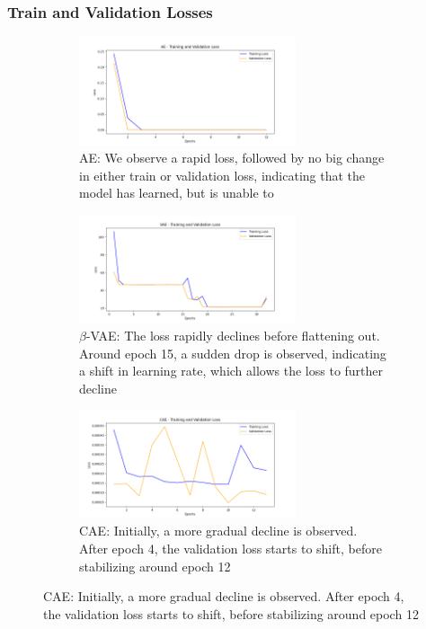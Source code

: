 \subsubsection{Train and Validation Losses}
\begin{figure}[!htbp]
  \centering
  \begin{subfigure}{\textwidth}
    \centering
    \includegraphics[width=0.7\textwidth]{figures/losses/ae.png}
    \caption{AE: We observe a rapid loss, followed by no big change in either train or validation loss, indicating that the model has learned, but is unable to }
  \end{subfigure}
  
  \vspace{0.5cm}
  
  \begin{subfigure}{\textwidth}
    \centering
    \includegraphics[width=0.7\textwidth]{figures/losses/vae.png}
    \caption{$\beta$-VAE: The loss rapidly declines before flattening out. Around epoch 15, a sudden drop is observed, indicating a shift in learning rate, which allows the loss to further decline}
  \end{subfigure}
  
  \vspace{0.5cm}
  
  \begin{subfigure}{\textwidth}
    \centering
    \includegraphics[width=0.7\textwidth]{figures/losses/cae.png}
    \caption{CAE: Initially, a more gradual decline is observed. After epoch 4, the validation loss starts to shift, before stabilizing around epoch 12}
  \end{subfigure}
  

\end{figure}
